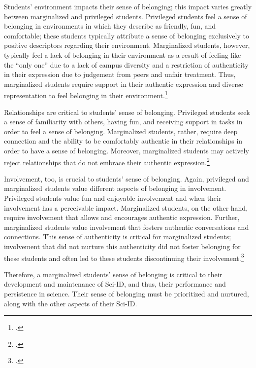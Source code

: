 \documentclass[10pt, twocolumn]{article}
\begin{document}
            Students' environment impacts their sense of belonging; this impact varies greatly between marginalized and privileged students. Privileged students feel a sense of belonging in environments in which they describe as friendly, fun, and comfortable; these students typically attribute a sense of belonging exclusively to positive descriptors regarding their environment. Marginalized students, however, typically feel a lack of belonging in their environment as a result of feeling like the ``only one'' due to a lack of campus diversity and a restriction of authenticity in their expression due to judgement from peers and unfair treatment. Thus, marginalized students require support in their authentic expression and diverse representation to feel belonging in their environment.\footcite{vaccaro_development_2016}

            Relationships are critical to students' sense of belonging. Privileged students seek a sense of familiarity with others, having fun, and receiving support in tasks in order to feel a sense of belonging. Marginalized students, rather, require deep connection and the ability to be comfortably authentic in their relationships in order to have a sense of belonging. Moreover, marginalized students may actively reject relationships that do not embrace their authentic expression.\footcite{vaccaro_development_2016}

            Involvement, too, is crucial to students' sense of belonging. Again, privileged and marginalized students value different aspects of belonging in involvement. Privileged students value fun and enjoyable involvement and when their involvement has a perceivable impact. Marginalized students, on the other hand, require involvement that allows and encourages authentic expression. Further, marginalized students value involvement that fosters authentic conversations and connections. This sense of authenticity is critical for marginalized students; involvement that did not nurture this authenticity did not foster belonging for these students and often led to these students discontinuing their involvement.\footcite{vaccaro_development_2016}


            Therefore, a marginalized students' sense of belonging is critical to their development and maintenance of Sci-ID, and thus, their performance and persistence in science. Their sense of belonging must be prioritized and nurtured, along with the other aspects of their Sci-ID.
\end{document}
